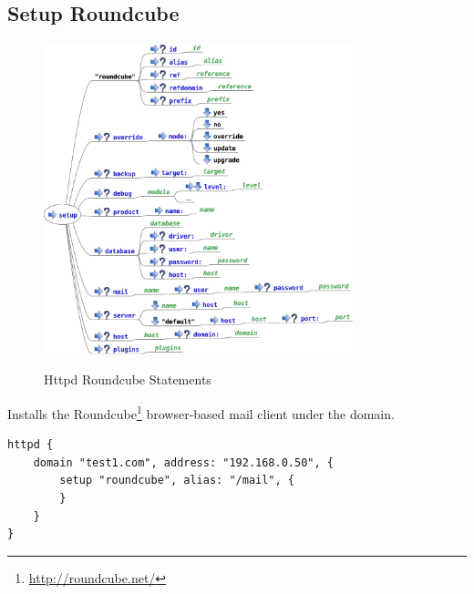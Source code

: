 \subsection{Setup Roundcube}


\begin{figure}[htp]
\centering
\includegraphics[width=0.8\textwidth]{httpd_setup_roundcube_script}
\label{fig:httpd_setup_roundcube_script}
\caption{Httpd Roundcube Statements}
\end{figure}


Installs the Roundcube\footnote{\url{http://roundcube.net/}} browser-based
mail client under the domain.

\begin{lstlisting}[style=Java]
httpd {
    domain "test1.com", address: "192.168.0.50", {
        setup "roundcube", alias: "/mail", {
        }
    }
}
\end{lstlisting}

